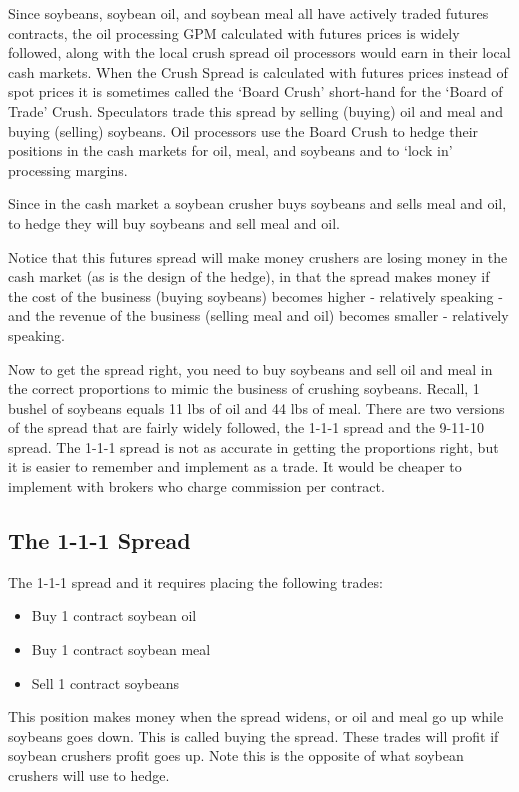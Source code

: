 \documentclass[
  letterpaper,
  DIV=11,
  numbers=noendperiod]{scrreprt}
\providecommand{\tightlist}{%
  \setlength{\itemsep}{0pt}\setlength{\parskip}{0pt}}\usepackage{longtable,booktabs,array}
\begin{document}
Since soybeans, soybean oil, and soybean meal all have actively traded
futures contracts, the oil processing GPM calculated with futures prices
is widely followed, along with the local crush spread oil processors
would earn in their local cash markets. When the Crush Spread is
calculated with futures prices instead of spot prices it is sometimes
called the `Board Crush' short-hand for the `Board of Trade' Crush.
Speculators trade this spread by selling (buying) oil and meal and
buying (selling) soybeans. Oil processors use the Board Crush to hedge
their positions in the cash markets for oil, meal, and soybeans and to
`lock in' processing margins.

Since in the cash market a soybean crusher buys soybeans and sells meal
and oil, to hedge they will buy soybeans and sell meal and oil.

Notice that this futures spread will make money crushers are losing
money in the cash market (as is the design of the hedge), in that the
spread makes money if the cost of the business (buying soybeans) becomes
higher - relatively speaking - and the revenue of the business (selling
meal and oil) becomes smaller - relatively speaking.

Now to get the spread right, you need to buy soybeans and sell oil and
meal in the correct proportions to mimic the business of crushing
soybeans. Recall, 1 bushel of soybeans equals 11 lbs of oil and 44 lbs
of meal. There are two versions of the spread that are fairly widely
followed, the 1-1-1 spread and the 9-11-10 spread. The 1-1-1 spread is
not as accurate in getting the proportions right, but it is easier to
remember and implement as a trade. It would be cheaper to implement with
brokers who charge commission per contract.

\subsection{The 1-1-1 Spread}\label{the-1-1-1-spread}

The 1-1-1 spread and it requires placing the following trades:

\begin{itemize}
\tightlist
\item
  Buy 1 contract soybean oil
\item
  Buy 1 contract soybean meal
\item
  Sell 1 contract soybeans
\end{itemize}

This position makes money when the spread widens, or oil and meal go up
while soybeans goes down. This is called buying the spread. These trades
will profit if soybean crushers profit goes up. Note this is the
opposite of what soybean crushers will use to hedge.
\end{document}
